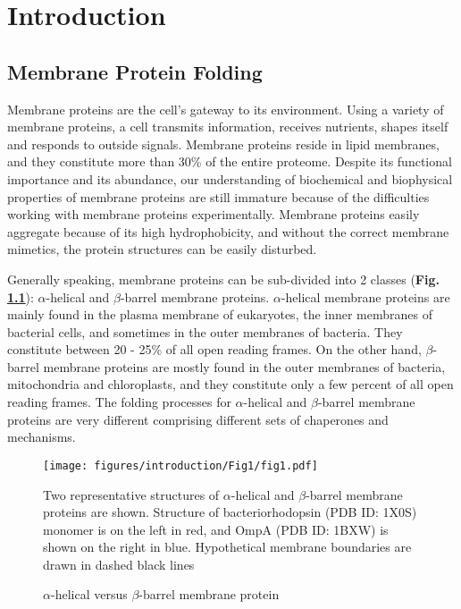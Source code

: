 


\chapter{Introduction}
\section{Membrane Protein Folding}
Membrane proteins are the cell's gateway to its environment. Using a variety of membrane proteins, a cell transmits information, receives nutrients, shapes itself and responds to outside signals. Membrane proteins reside in lipid membranes, and they constitute more than 30\% of the entire proteome. Despite its functional importance and its abundance, our understanding of biochemical and biophysical properties of membrane proteins are still immature because of the difficulties working with membrane proteins experimentally. Membrane proteins easily aggregate because of its high hydrophobicity, and without the correct membrane mimetics, the protein structures can be easily disturbed.

Generally speaking, membrane proteins can be sub-divided into 2 classes (\textbf{Fig. \ref{fig:intro_f1}}): $\alpha$-helical and $\beta$-barrel membrane proteins. $\alpha$-helical membrane proteins are mainly found in the plasma membrane of eukaryotes, the inner membranes of bacterial cells, and sometimes in the outer membranes of bacteria. They constitute between 20 - 25\% of all open reading frames. On the other hand, $\beta$-barrel membrane proteins are mostly found in the outer membranes of bacteria, mitochondria and chloroplasts, and they constitute only a few percent of all open reading frames. The folding processes for $\alpha$-helical and $\beta$-barrel membrane proteins are very different comprising different sets of chaperones and mechanisms.

\begin{figure}[!ht]
\begin{center}
	\texttt{[image: figures/introduction/Fig1/fig1.pdf]}
\end{center}
	\caption{$\alpha$-helical versus $\beta$-barrel membrane protein}
Two representative structures of $\alpha$-helical and $\beta$-barrel membrane proteins are shown. Structure of bacteriorhodopsin (PDB ID: 1X0S) monomer is on the left in red, and OmpA (PDB ID: 1BXW) is shown on the right in blue. Hypothetical membrane boundaries are drawn in dashed black lines
	\label{fig:intro_f1}
\end{figure}

